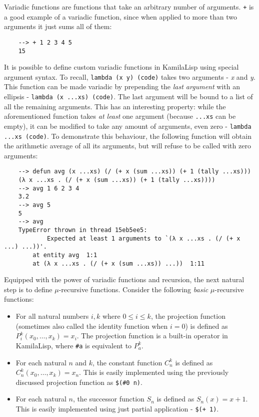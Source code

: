 Variadic functions are functions that take an arbitrary number of arguments. \verb|+| is a good example of a variadic function, since when applied to more than two arguments it just sums all of them:

\begin{Verbatim}
    --> + 1 2 3 4 5
    15
\end{Verbatim}

It is possible to define custom variadic functions in KamilaLisp using special argument syntax. To recall, \verb|lambda (x y) (code)| takes two arguments - \textit{x} and \textit{y}. This function can be made variadic by prepending the \textit{last argument} with an ellipsis - \verb|lambda (x ...xs) (code)|. The last argument will be bound to a list of all the remaining arguments. This has an interesting property: while the aforementioned function takes \textit{at least} one argument (because \verb|...xs| can be empty), it can be modified to take any amount of arguments, even zero - \verb|lambda ...xs (code)|. To demonstrate this behaviour, the following function will obtain the arithmetic average of all its arguments, but will refuse to be called with zero arguments:

\begin{Verbatim}
    --> defun avg (x ...xs) (/ (+ x (sum ...xs)) (+ 1 (tally ...xs)))
    (λ x ...xs . (/ (+ x (sum ...xs)) (+ 1 (tally ...xs))))
    --> avg 1 6 2 3 4
    3.2
    --> avg 5
    5
    --> avg
    TypeError thrown in thread 15eb5ee5:
            Expected at least 1 arguments to `(λ x ...xs . (/ (+ x ...) ...))'.
        at entity avg  1:1
        at (λ x ...xs . (/ (+ x (sum ...xs)) ...))  1:11
\end{Verbatim}

Equipped with the power of variadic functions and recursion, the next natural step is to define $\mu$-recursive functions. Consider the following \textit{basic} $\mu$-recursive functions:

\begin{itemize}
    \item For all natural numbers $i, k$ where $0 \le i \le k$, the projection function (sometimes also called the identity function when $i=0$) is defined as $P_i^k(x_0, \dots, x_k)=x_i$. The projection function is a built-in operator in KamilaLisp, where \verb|#a| is equivalent to $P_a^k$.
    \item For each natural $n$ and $k$, the constant function $C_n^k$ is defined as $C_n^k(x_0, \dots, x_k) = x_n$. This is easily implemented using the previously discussed projection function as \verb|$(#0 n)|.
    \item For each natural $n$, the successor function $S_n$ is defined as $S_n(x) = x + 1$. This is easily implemented using just partial application - \verb|$(+ 1)|.
\end{itemize}

